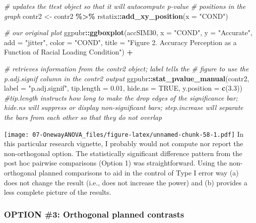\documentclass[
  11pt,
]{book}
\newenvironment{Shaded}{\begin{snugshade}}{\end{snugshade}}
\newcommand{\AttributeTok}[1]{\textcolor[rgb]{0.27,0.27,0.27}{#1}}
\newcommand{\CommentTok}[1]{\textcolor[rgb]{0.37,0.37,0.37}{\textit{#1}}}
\newcommand{\ConstantTok}[1]{\textcolor[rgb]{0.37,0.37,0.37}{#1}}
\newcommand{\FloatTok}[1]{\textcolor[rgb]{0.06,0.06,0.06}{#1}}
\newcommand{\FunctionTok}[1]{\textcolor[rgb]{0.27,0.27,0.27}{\textbf{#1}}}
\newcommand{\NormalTok}[1]{#1}
\newcommand{\OtherTok}[1]{\textcolor[rgb]{0.37,0.37,0.37}{#1}}
\newcommand{\SpecialCharTok}[1]{\textcolor[rgb]{0.43,0.43,0.43}{\textbf{#1}}}
\newcommand{\StringTok}[1]{\textcolor[rgb]{0.5,0.5,0.5}{#1}}
\begin{document}
\begin{Shaded}
\begin{Highlighting}[]
\CommentTok{\# updates the ttest object so that it will autocompute p{-}value}
\CommentTok{\# positions in the graph}
\NormalTok{contr2 }\OtherTok{\textless{}{-}}\NormalTok{ contr2 }\SpecialCharTok{\%\textgreater{}\%}
\NormalTok{    rstatix}\SpecialCharTok{::}\FunctionTok{add\_xy\_position}\NormalTok{(}\AttributeTok{x =} \StringTok{"COND"}\NormalTok{)}

\CommentTok{\# our original plot}
\NormalTok{ggpubr}\SpecialCharTok{::}\FunctionTok{ggboxplot}\NormalTok{(accSIM30, }\AttributeTok{x =} \StringTok{"COND"}\NormalTok{, }\AttributeTok{y =} \StringTok{"Accurate"}\NormalTok{, }\AttributeTok{add =} \StringTok{"jitter"}\NormalTok{,}
    \AttributeTok{color =} \StringTok{"COND"}\NormalTok{, }\AttributeTok{title =} \StringTok{"Figure 2. Accuracy Perception as a Function of Racial Loading Condition"}\NormalTok{) }\SpecialCharTok{+}

\CommentTok{\# retrieves information from the contr2 object; label tells the}
\CommentTok{\# figure to use the \textquotesingle{}p.adj.signif\textquotesingle{} column in the contr2 output}
\NormalTok{ggpubr}\SpecialCharTok{::}\FunctionTok{stat\_pvalue\_manual}\NormalTok{(contr2, }\AttributeTok{label =} \StringTok{"p.adj.signif"}\NormalTok{, }\AttributeTok{tip.length =} \FloatTok{0.01}\NormalTok{,}
    \AttributeTok{hide.ns =} \ConstantTok{TRUE}\NormalTok{, }\AttributeTok{y.position =} \FunctionTok{c}\NormalTok{(}\FloatTok{3.3}\NormalTok{))  }\CommentTok{\#tip.length instructs how long to make the drop edges of the significance bar; hide.ns will suppress or display non{-}significant bars; step.increase will separate the bars from each other so that they do not overlap}
\end{Highlighting}
\end{Shaded}

\texttt{[image: 07-OnewayANOVA\_files/figure-latex/unnamed-chunk-58-1.pdf]} In this particular research vignette, I probably would not compute nor report the non-orthogonal option. The statistically significant difference pattern from the post hoc pairwise comparisons (Option 1) was straightforward. Using the non-orthogonal planned comparisons to aid in the control of Type I error way (a) does not change the result (i.e., does not increase the power) and (b) provides a less complete picture of the results.

\hypertarget{option-3-orthogonal-planned-contrasts}{%
\subsubsection{OPTION \#3: Orthogonal planned contrasts}\label{option-3-orthogonal-planned-contrasts}}
\end{document}
